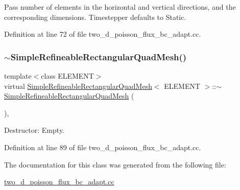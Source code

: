 Pass number of elements in the horizontal and vertical directions, and the corresponding dimensions. Timestepper defaults to Static. 



Definition at line 72 of file two\+\_\+d\+\_\+poisson\+\_\+flux\+\_\+bc\+\_\+adapt.\+cc.

\mbox{\label{classSimpleRefineableRectangularQuadMesh_a8f258e0b5178ccb33f0596ae5a33c3c5}} 
\subsubsection{\texorpdfstring{$\sim$\+Simple\+Refineable\+Rectangular\+Quad\+Mesh()}{~SimpleRefineableRectangularQuadMesh()}}
{\footnotesize\ttfamily template$<$class E\+L\+E\+M\+E\+NT$>$ \\
virtual \hyperlink{classSimpleRefineableRectangularQuadMesh}{Simple\+Refineable\+Rectangular\+Quad\+Mesh}$<$ E\+L\+E\+M\+E\+NT $>$\+::$\sim$\hyperlink{classSimpleRefineableRectangularQuadMesh}{Simple\+Refineable\+Rectangular\+Quad\+Mesh} (\begin{DoxyParamCaption}{ }\end{DoxyParamCaption})\hspace{0.3cm}{\ttfamily [inline]}, {\ttfamily [virtual]}}



Destructor\+: Empty. 



Definition at line 89 of file two\+\_\+d\+\_\+poisson\+\_\+flux\+\_\+bc\+\_\+adapt.\+cc.



The documentation for this class was generated from the following file\+:\begin{DoxyCompactItemize}
\item 
\hyperlink{two__d__poisson__flux__bc__adapt_8cc}{two\+\_\+d\+\_\+poisson\+\_\+flux\+\_\+bc\+\_\+adapt.\+cc}\end{DoxyCompactItemize}
